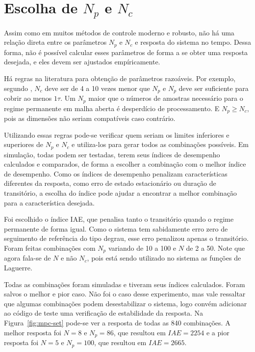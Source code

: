 \section{Escolha de \(N_p\) e \(N_c\)}%
\label{sec:choose_Nc_Np}

Assim como em muitos métodos de controle moderno e robusto, não há uma relação
direta entre os parâmetros \(N_p\) e \(N_c\) e resposta do sistema no tempo.
Dessa forma, não é possível calcular esses parâmetros de forma a se obter uma
resposta desejada, e eles devem ser ajustados empíricamente.

Há regras na literatura para obtenção de parâmetros razoáveis. Por exemplo,
segundo \textcite{book:wang}, \(N_c\) deve ser de 4 a 10 vezes menor que \(N_p\)
e \(N_p\) deve ser suficiente para cobrir ao menos \(1 \tau{}\). Um \(N_p\)
maior que o números de amostras necessário para o regime permanente em malha
aberta é desperdício de processamento. E \(N_p \ge N_c\), pois as dimensões não
seriam compatíveis caso contrário.

Utilizando essas regras pode-se verificar quem seriam os limites inferiores e
superiores de \(N_p\) e \(N_c\) e utiliza-los para gerar todos as combinações
possíveis. Em simulação, todas podem ser testadas, terem seus índices de
desempenho calculados e comparados, de forma a escolher a combinação com o
melhor índice de desempenho. Como os índices de desempenho penalizam
características diferentes da resposta, como erro de estado estacionário ou
duração de transitório, a escolha do índice pode ajudar a encontrar a melhor
combinação para a característica desejada.

Foi escolhido o índice IAE, que penalisa tanto o transitório quando o regime
permanente de forma igual. Como o sistema tem sabidamente erro zero de
seguimento de referência do tipo degrau, esse erro penalizou apenas o
transitório. Foram feitas combinações com \(N_p\) variando de 10 a 100 e \(N\)
de 2 a 50. Note que agora fala-se de \(N\) e não \(N_c\), pois está sendo
utilizado no sistema as funções de Laguerre.

Todas as combinações foram simuladas e tiveram seus índices calculados. Foram
salvos o melhor e pior caso. Não foi o caso desse experimento, mas vale
ressaltar que algumas combinações podem desestabilizar o sistema, logo convém
adicionar ao código de teste uma verificação de estabilidade da resposta. Na
Figura~\ref{fig:mpc-set} pode-se ver a resposta de todas as 840 combinações. A
melhor resposta foi \(N=8\) e \(N_p=86\), que resultou em \(IAE=2254\) e a
pior resposta foi \(N=5\) e \(N_p=100\), que resultou em \(IAE=2665\).

